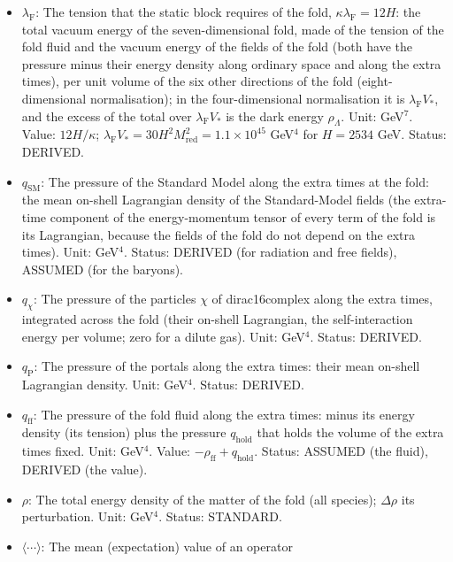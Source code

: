 \documentclass[
  10pt,
]{article}
\begin{document}
\begin{itemize}
  the Higgs potential with its loop corrections), a tension of the
  seven-dimensional fold. Unit: GeV\(^4\). Status: STANDARD.
\item
  \(\lambda_{\mathrm{F}}\): The tension that the static block requires
  of the fold, \(\kappa\lambda_{\mathrm{F}} = 12H\): the total vacuum
  energy of the seven-dimensional fold, made of the tension of the fold
  fluid and the vacuum energy of the fields of the fold (both have the
  pressure minus their energy density along ordinary space and along the
  extra times), per unit volume of the six other directions of the fold
  (eight-dimensional normalisation); in the four-dimensional
  normalisation it is \(\lambda_{\mathrm{F}}V_*\), and the excess of the
  total over \(\lambda_{\mathrm{F}}V_*\) is the dark energy
  \(\rho_\Lambda\). Unit: GeV\(^7\). Value: \(12H/\kappa\);
  \(\lambda_{\mathrm{F}}V_* = 30H^2M_{\mathrm{red}}^2 = 1.1\times10^{45}\)
  GeV\(^4\) for \(H = 2534\) GeV. Status: DERIVED.
\item
  \(q_{\mathrm{SM}}\): The pressure of the Standard Model along the
  extra times at the fold: the mean on-shell Lagrangian density of the
  Standard-Model fields (the extra-time component of the energy-momentum
  tensor of every term of the fold is its Lagrangian, because the fields
  of the fold do not depend on the extra times). Unit: GeV\(^4\).
  Status: DERIVED (for radiation and free fields), ASSUMED (for the
  baryons).
\item
  \(q_\chi\): The pressure of the particles \(\chi\) of dirac16complex
  along the extra times, integrated across the fold (their on-shell
  Lagrangian, the self-interaction energy per volume; zero for a dilute
  gas). Unit: GeV\(^4\). Status: DERIVED.
\item
  \(q_{\mathrm{P}}\): The pressure of the portals along the extra times:
  their mean on-shell Lagrangian density. Unit: GeV\(^4\). Status:
  DERIVED.
\item
  \(q_{\mathrm{ff}}\): The pressure of the fold fluid along the extra
  times: minus its energy density (its tension) plus the pressure
  \(q_{\mathrm{hold}}\) that holds the volume of the extra times fixed.
  Unit: GeV\(^4\). Value: \(-\rho_{\mathrm{ff}} + q_{\mathrm{hold}}\).
  Status: ASSUMED (the fluid), DERIVED (the value).
\item
  \(\rho\): The total energy density of the matter of the fold (all
  species); \(\Delta\rho\) its perturbation. Unit: GeV\(^4\). Status:
  STANDARD.
\item
  \(\langle\cdots\rangle\): The mean (expectation) value of an operator

\end{itemize}
\end{document}
